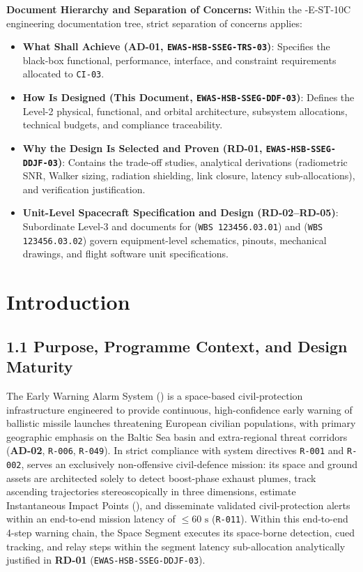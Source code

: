 \textbf{Document Hierarchy and Separation of Concerns:} Within the  -E-ST-10C engineering documentation tree, strict separation of concerns applies:
\begin{itemize}[leftmargin=1.5em, itemsep=0.15em, topsep=0.15em]
    \item \textbf{What  Shall Achieve (\textbf{AD-01}, \texttt{EWAS-HSB-SSEG-TRS-03})}: Specifies the black-box functional, performance, interface, and constraint requirements allocated to \texttt{CI-03}.
    \item \textbf{How  Is Designed (This Document, \texttt{EWAS-HSB-SSEG-DDF-03})}: Defines the Level-2 physical, functional, and orbital architecture, subsystem allocations, technical budgets, and compliance traceability.
    \item \textbf{Why the Design Is Selected and Proven (\textbf{RD-01}, \texttt{EWAS-HSB-SSEG-DDJF-03})}: Contains the trade-off studies, analytical derivations (radiometric SNR, Walker sizing, radiation shielding, link closure, latency sub-allocations), and verification justification.
    \item \textbf{Unit-Level Spacecraft Specification and Design (\textbf{RD-02}--\textbf{RD-05})}: Subordinate Level-3  and  documents for  (\texttt{WBS 123456.03.01}) and  (\texttt{WBS 123456.03.02}) govern equipment-level schematics, pinouts, mechanical drawings, and flight software unit specifications.
\end{itemize}

\newpage

\section{Introduction}

\subsection{1.1 Purpose, Programme Context, and Design Maturity}

The Early Warning Alarm System () is a space-based civil-protection infrastructure engineered to provide continuous, high-confidence early warning of ballistic missile launches threatening European civilian populations, with primary geographic emphasis on the Baltic Sea basin and extra-regional threat corridors (\textbf{AD-02}, \texttt{R-006}, \texttt{R-049}). In strict compliance with system directives \texttt{R-001} and \texttt{R-002},  serves an exclusively non-offensive civil-defence mission: its space and ground assets are architected solely to detect boost-phase exhaust plumes, track ascending trajectories stereoscopically in three dimensions, estimate Instantaneous Impact Points (), and disseminate validated civil-protection alerts within an end-to-end mission latency of $\le 60\text{ s}$ (\texttt{R-011}). Within this end-to-end 4-step warning chain, the Space Segment executes its space-borne detection, cued tracking, and relay steps within the segment latency sub-allocation analytically justified in \textbf{RD-01} (\texttt{EWAS-HSB-SSEG-DDJF-03}).


